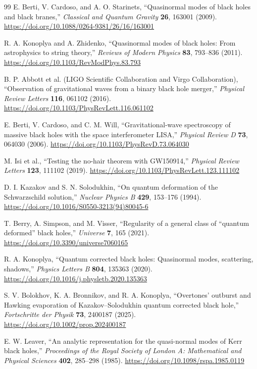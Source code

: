 \documentclass[12pt,a4paper]{article}
\begin{document}
\begin{thebibliography}{99}
E. Berti, V. Cardoso, and A. O. Starinets,
``Quasinormal modes of black holes and black branes,''
\emph{Classical and Quantum Gravity} \textbf{26}, 163001 (2009).
\url{https://doi.org/10.1088/0264-9381/26/16/163001}

R. A. Konoplya and A. Zhidenko,
``Quasinormal modes of black holes: From astrophysics to string theory,''
\emph{Reviews of Modern Physics} \textbf{83}, 793--836 (2011).
\url{https://doi.org/10.1103/RevModPhys.83.793}

B. P. Abbott et al. (LIGO Scientific Collaboration and Virgo Collaboration),
``Observation of gravitational waves from a binary black hole merger,''
\emph{Physical Review Letters} \textbf{116}, 061102 (2016).
\url{https://doi.org/10.1103/PhysRevLett.116.061102}

E. Berti, V. Cardoso, and C. M. Will,
``Gravitational-wave spectroscopy of massive black holes with the space interferometer LISA,''
\emph{Physical Review D} \textbf{73}, 064030 (2006).
\url{https://doi.org/10.1103/PhysRevD.73.064030}

M. Isi et al.,
``Testing the no-hair theorem with GW150914,''
\emph{Physical Review Letters} \textbf{123}, 111102 (2019).
\url{https://doi.org/10.1103/PhysRevLett.123.111102}

D. I. Kazakov and S. N. Solodukhin,
``On quantum deformation of the Schwarzschild solution,''
\emph{Nuclear Physics B} \textbf{429}, 153--176 (1994).
\url{https://doi.org/10.1016/S0550-3213(94)80045-6}

T. Berry, A. Simpson, and M. Visser,
``Regularity of a general class of ``quantum deformed'' black holes,''
\emph{Universe} \textbf{7}, 165 (2021).
\url{https://doi.org/10.3390/universe7060165}

R. A. Konoplya,
``Quantum corrected black holes: Quasinormal modes, scattering, shadows,''
\emph{Physics Letters B} \textbf{804}, 135363 (2020).
\url{https://doi.org/10.1016/j.physletb.2020.135363}

S. V. Bolokhov, K. A. Bronnikov, and R. A. Konoplya,
``Overtones' outburst and Hawking evaporation of Kazakov--Solodukhin quantum corrected black hole,''
\emph{Fortschritte der Physik} \textbf{73}, 2400187 (2025).
\url{https://doi.org/10.1002/prop.202400187}

E. W. Leaver,
``An analytic representation for the quasi-normal modes of Kerr black holes,''
\emph{Proceedings of the Royal Society of London A: Mathematical and Physical Sciences} \textbf{402}, 285--298 (1985).
\url{https://doi.org/10.1098/rspa.1985.0119}


\end{thebibliography}
\end{document}
